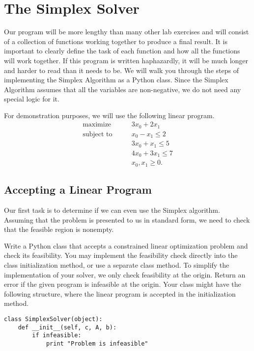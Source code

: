 \section*{The Simplex Solver}
Our program will be more lengthy than many other lab exercises and will consist of a collection of functions working
together to produce a final result.
It is important to clearly define the task of each function and how all the functions will work together.
If this program is written haphazardly, it will be much longer and harder to read than it needs to be.
We will walk you through the steps of implementing the Simplex Algorithm as a Python class.
Since the Simplex Algorithm assumes that all the variables are non-negative, we do not need any special logic for it.

For demonstration purposes, we will use the following linear program.
\begin{align*}
\text{maximize}\qquad & 3x_0 + 2x_1 \\
\text{subject to}\qquad
& x_0 - x_1 \leq 2 \\
& 3x_0 + x_1 \leq 5 \\
& 4x_0 + 3x_1 \leq 7 \\
& x_0, x_1 \geq 0.
\end{align*}

\subsection{Accepting a Linear Program}
Our first task is to determine if we can even use the Simplex algorithm.
Assuming that the problem is presented to us in standard form, we need
to check that the feasible region is nonempty.

\begin{problem}
Write a Python class that accepts a constrained linear optimization problem and check its feasibility.
You may implement the feasibility check directly into the class initialization method, or use a separate class method.
To simplify the implementation of your solver, we only check feasibility at the origin.
Return an error if the given program is infeasible at the origin.
Your class might have the following structure, where the linear program is accepted in the initialization method.
\begin{lstlisting}
class SimplexSolver(object):
    def __init__(self, c, A, b):
        if infeasible:
            print "Problem is infeasible"
\end{lstlisting}
\label{prob:initsolver}
\end{problem}

